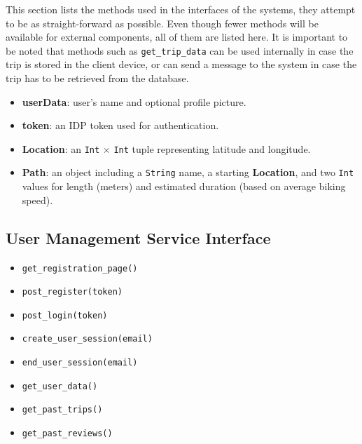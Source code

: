 This section lists the methods used in the interfaces of the systems, they attempt to be as straight-forward as possible. Even though fewer methods will be available for external components, all of them are listed here.
It is important to be noted that methods such as \texttt{get\_trip\_data} can be used internally in case the trip is stored in the client device, or can send a message to the system in case the trip has to be retrieved from the database. 

\begin{itemize}
    \item \textbf{userData}: user's name and optional profile picture.
    \item \textbf{token}: an IDP token used for authentication.
    \item \textbf{Location}: an \texttt{Int} \(\times\) \texttt{Int} tuple representing latitude and longitude.
    \item \textbf{Path}: an object including a \texttt{String} name, a starting \textbf{Location}, and two \texttt{Int} values for length (meters) and estimated duration (based on average biking speed).
\end{itemize}


\subsection{User Management Service Interface}
\begin{itemize}
    \item \texttt{get\_registration\_page()}
    \item \texttt{post\_register(token)}
    \item \texttt{post\_login(token)}
    \item \texttt{create\_user\_session(email)}
    \item \texttt{end\_user\_session(email)}
    \item \texttt{get\_user\_data()}
    \item \texttt{get\_past\_trips()}
    \item \texttt{get\_past\_reviews()}
\end{itemize}

